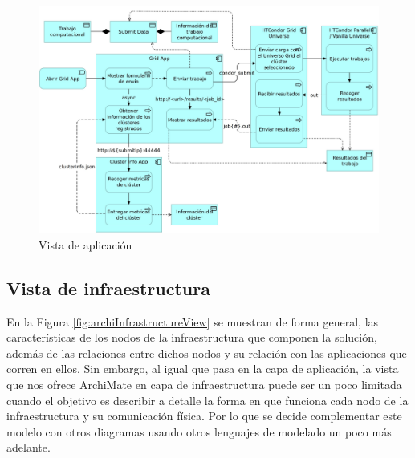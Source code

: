 \begin{figure}[H]
	\centering
	\includegraphics[scale=0.12]{tablas-images/archi/Application View.jpg}
	\caption{Vista de aplicación}
    \label{fig:archiAppView}
\end{figure}

\subsection{Vista de infraestructura}
\noindent
En la Figura \ref{fig:archiInfrastructureView} se muestran de forma general, las características de los nodos de la infraestructura que componen la solución, además de las relaciones entre dichos nodos y su relación con las aplicaciones que corren en ellos. Sin embargo, al igual que pasa en la capa de aplicación, la vista que nos ofrece ArchiMate en capa de infraestructura puede ser un poco limitada cuando el objetivo es describir a detalle la forma en que funciona cada nodo de la infraestructura y su comunicación física. Por lo que se decide complementar este modelo con otros diagramas usando otros lenguajes de modelado un poco más adelante.

